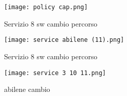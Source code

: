 \begin{figure}[h]
    \centering
   \texttt{[image: policy cap.png]}
    \caption{Servizio 8 sw cambio percorso}
    \label{fig:policy cap}
\end{figure}

\begin{figure}[h]
    \centering
   \texttt{[image: service abilene (11).png]}
    \caption{Servizio 8 sw cambio percorso}
    \label{fig:abilene dopo}
\end{figure}

\begin{figure}[h]
    \centering
   \texttt{[image: service 3 10 11.png]}
    \caption{abilene cambio }
    \label{fig:abilene post}
\end{figure}


